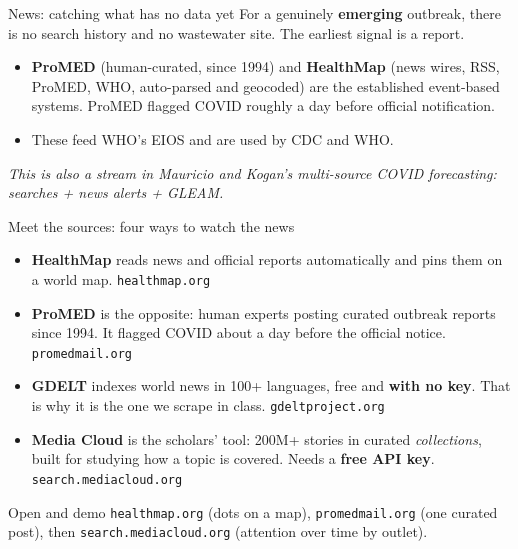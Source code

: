 \documentclass[aspectratio=169,11pt]{beamer}
\begin{document}
\begin{frame}{News: catching what has no data yet}
  For a genuinely \textbf{emerging} outbreak, there is no search history and no wastewater
  site. The earliest signal is a report.
  \begin{itemize}
    \item \textbf{ProMED} (human-curated, since 1994) and \textbf{HealthMap} (news wires,
          RSS, ProMED, WHO, auto-parsed and geocoded) are the established event-based
          systems. ProMED flagged COVID roughly a day before official notification.
    \item These feed WHO's EIOS and are used by CDC and WHO.
  \end{itemize}
  \vspace{0.3em}
  \begin{center}
    \itshape This is also a stream in Mauricio and Kogan's multi-source COVID forecasting:
    searches + news alerts + GLEAM.
  \end{center}
\end{frame}

\begin{frame}{Meet the sources: four ways to watch the news}
  \begin{itemize}
    \item \textbf{HealthMap} reads news and official reports automatically and pins them on a
          world map. \texttt{healthmap.org}
    \item \textbf{ProMED} is the opposite: human experts posting curated outbreak reports
          since 1994. It flagged COVID about a day before the official notice.
          \texttt{promedmail.org}
    \item \textbf{GDELT} indexes world news in 100+ languages, free and \textbf{with no key}.
          That is why it is the one we scrape in class. \texttt{gdeltproject.org}
    \item \textbf{Media Cloud} is the scholars' tool: 200M+ stories in curated
          \emph{collections}, built for studying how a topic is covered. Needs a
          \textbf{free API key}. \texttt{search.mediacloud.org}
  \end{itemize}
  \begin{exampleblock}{Open and demo}
    \texttt{healthmap.org} (dots on a map), \texttt{promedmail.org} (one curated post), then
    \texttt{search.mediacloud.org} (attention over time by outlet).
  \end{exampleblock}
\end{frame}
\end{document}
